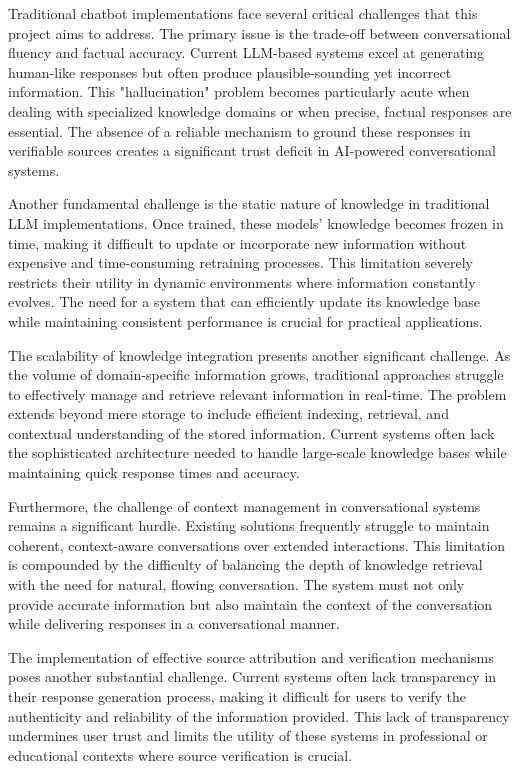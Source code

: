 \documentclass[12pt,a4paper]{report}
\begin{document}
Traditional chatbot implementations face several critical challenges that this project aims to address. The primary issue is the trade-off between conversational fluency and factual accuracy. Current LLM-based systems excel at generating human-like responses but often produce plausible-sounding yet incorrect information. This "hallucination" problem becomes particularly acute when dealing with specialized knowledge domains or when precise, factual responses are essential. The absence of a reliable mechanism to ground these responses in verifiable sources creates a significant trust deficit in AI-powered conversational systems.

Another fundamental challenge is the static nature of knowledge in traditional LLM implementations. Once trained, these models' knowledge becomes frozen in time, making it difficult to update or incorporate new information without expensive and time-consuming retraining processes. This limitation severely restricts their utility in dynamic environments where information constantly evolves. The need for a system that can efficiently update its knowledge base while maintaining consistent performance is crucial for practical applications.

The scalability of knowledge integration presents another significant challenge. As the volume of domain-specific information grows, traditional approaches struggle to effectively manage and retrieve relevant information in real-time. The problem extends beyond mere storage to include efficient indexing, retrieval, and contextual understanding of the stored information. Current systems often lack the sophisticated architecture needed to handle large-scale knowledge bases while maintaining quick response times and accuracy.

Furthermore, the challenge of context management in conversational systems remains a significant hurdle. Existing solutions frequently struggle to maintain coherent, context-aware conversations over extended interactions. This limitation is compounded by the difficulty of balancing the depth of knowledge retrieval with the need for natural, flowing conversation. The system must not only provide accurate information but also maintain the context of the conversation while delivering responses in a conversational manner.

The implementation of effective source attribution and verification mechanisms poses another substantial challenge. Current systems often lack transparency in their response generation process, making it difficult for users to verify the authenticity and reliability of the information provided. This lack of transparency undermines user trust and limits the utility of these systems in professional or educational contexts where source verification is crucial.
\end{document}
